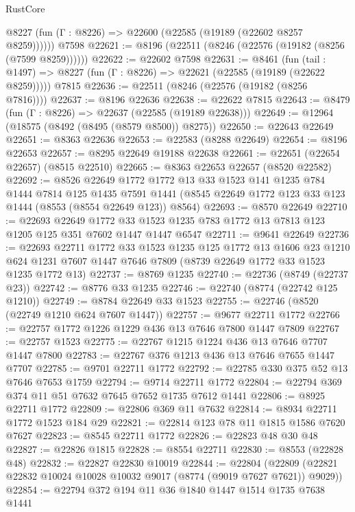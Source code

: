 \begin{lexlean}{RustCore}
\begin{coremodule}
      @8227 (fun (Γ : @8226) => @22600 (@22585 (@19189 (@22602 @8257 @8259))))))
    @7598
@22621 := @8196 (@22511 (@8246 (@22576 (@19182 (@8256 (@7599 @8259))))))
@22622 := @22602 @7598
@22631 := @8461
    (fun (tail : @1497) => @8227 (fun (Γ : @8226) => @22621 (@22585 (@19189 (@22622 @8259)))))
    @7815
@22636 := @22511 (@8246 (@22576 (@19182 (@8256 @7816))))
@22637 := @8196 @22636
@22638 := @22622 @7815
@22643 := @8479 (fun (Γ : @8226) => @22637 (@22585 (@19189 @22638)))
@22649 := @12964 (@18575 (@8492 (@8495 (@8579 @8500)) @8275))
@22650 := @22643 @22649
@22651 := @8363 @22636
@22653 := @22583 (@8288 @22649)
@22654 := @8196 @22653
@22657 := @8295 @22649 @19188 @22638
@22661 := @22651 (@22654 @22657) (@8515 @22510)
@22665 := @8363 @22653 @22657 (@8520 @22582)
@22692 := @8526
    @22649
    @1772
    @1772
    @13
    @33
    @1523
    @141
    @1235
    @784
    @1444
    @7814
    @125
    @1435
    @7591
    @1441
    (@8545 @22649 @1772 @123 @33 @123 @1444 (@8553 (@8554 @22649 @123)) @8564)
@22693 := @8570 @22649
@22710 := @22693
    @22649
    @1772
    @33
    @1523
    @1235
    @783
    @1772
    @13
    @7813
    @123
    @1205
    @125
    @351
    @7602
    @1447
    @1447
    @6547
@22711 := @9641 @22649
@22736 := @22693
    @22711
    @1772
    @33
    @1523
    @1235
    @125
    @1772
    @13
    @1606
    @23
    @1210
    @624
    @1231
    @7607
    @1447
    @7646
    @7809
    (@8739 @22649 @1772 @33 @1523 @1235 @1772 @13)
@22737 := @8769 @1235
@22740 := @22736 (@8749 (@22737 @23))
@22742 := @8776 @33 @1235
@22746 := @22740 (@8774 (@22742 @125 @1210))
@22749 := @8784 @22649 @33 @1523
@22755 := @22746 (@8520 (@22749 @1210 @624 @7607 @1447))
@22757 := @9677 @22711 @1772
@22766 := @22757 @1772 @1226 @1229 @436 @13 @7646 @7800 @1447 @7809
@22767 := @22757 @1523
@22775 := @22767 @1215 @1224 @436 @13 @7646 @7707 @1447 @7800
@22783 := @22767 @376 @1213 @436 @13 @7646 @7655 @1447 @7707
@22785 := @9701 @22711 @1772
@22792 := @22785 @330 @375 @52 @13 @7646 @7653 @1759
@22794 := @9714 @22711 @1772
@22804 := @22794 @369 @374 @11 @51 @7632 @7645 @7652 @1735 @7612 @1441
@22806 := @8925 @22711 @1772
@22809 := @22806 @369 @11 @7632
@22814 := @8934 @22711 @1772 @1523 @184 @29
@22821 := @22814 @123 @78 @11 @1815 @1586 @7620 @7627
@22823 := @8545 @22711 @1772
@22826 := @22823 @48 @30 @48
@22827 := @22826 @1815
@22828 := @8554 @22711
@22830 := @8553 (@22828 @48)
@22832 := @22827 @22830 @10019
@22844 := @22804
    (@22809 (@22821 @22832 @10024 @10028 @10032 @9017 (@8774 (@9019 @7627 @7621)) @9029))
@22854 := @22794 @372 @194 @11 @36 @1840 @1447 @1514 @1735 @7638 @1441

\end{coremodule}
\end{lexlean}
